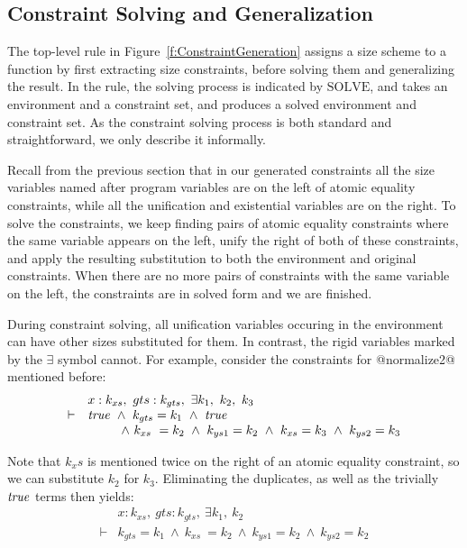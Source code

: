 \subsection{Constraint Solving and Generalization}
The top-level rule in Figure~\ref{f:ConstraintGeneration} assigns a size scheme to a function by first extracting size constraints, before solving them and generalizing the result. In the rule, the solving process is indicated by $\textrm{SOLVE}$, and takes an environment and a constraint set, and produces a solved environment and constraint set. As the constraint solving process is both standard and straightforward, we only describe it informally.

Recall from the previous section that in our generated constraints all the size variables named after program variables are on the left of atomic equality constraints, while all the unification and existential variables are on the right. To solve the constraints, we keep finding pairs of atomic equality constraints where the same variable appears on the left, unify the right of both of these constraints, and apply the resulting substitution to both the environment and original constraints. When there are no more pairs of constraints with the same variable on the left, the constraints are in solved form and we are finished.

During constraint solving, all unification variables occuring in the environment can have other sizes substituted for them. In contrast, the rigid variables marked by the $\exists$ symbol cannot. For example, consider the constraints for @normalize2@ mentioned before:
$$
\begin{array}{ll}
       & x : k_{xs},~ gts : k_{gts},~ \exists k_1,~ k_2,~ k_3 
\\
\vdash & \mathit{true} 
        ~\wedge~  k_{gts} = k_1
        ~\wedge~  \mathit{true}
\\     &~~~~~~~~ 
          \wedge~  k_{xs}  ~= k_2
        ~ \wedge~  k_{ys1}  = k_2 
        ~ \wedge~  k_{xs}   = k_3
        ~ \wedge~  k_{ys2}  = k_3
\end{array}
$$

Note that $k_xs$ is mentioned twice on the right of an atomic equality constraint, so we can substitute $k_2$ for $k_3$. Eliminating the duplicates, as well as the trivially $\mathit{true}$ terms then yields:
$$
\begin{array}{ll}
       & x : k_{xs},~ gts : k_{gts},~ \exists k_1,~ k_2 
\\
\vdash & k_{gts} = k_1
        ~\wedge~  k_{xs}  ~= k_2
        ~\wedge~  k_{ys1}  = k_2 
        ~\wedge~  k_{ys2}  = k_2
\end{array}
$$

